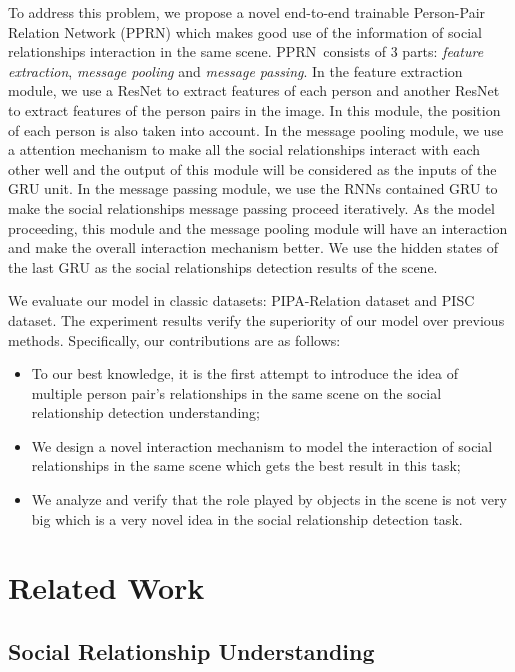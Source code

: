 \documentclass{article}
\newcommand{\PPRN}{{\sf PPRN}}
\begin{document}
To address this problem, we propose a novel end-to-end trainable Person-Pair Relation Network (\PPRN) which makes good use of the information of social relationships interaction in the same scene. \PPRN \ consists of 3 parts:  \emph{feature extraction}, \emph{message pooling} and \emph{message passing}. In the feature extraction module, we use a ResNet\cite{DBLP:conf/cvpr/HeZRS16} to extract features of each person and another ResNet to extract features of the person pairs in the image. In this module, the position of each person is also taken into account. In the message pooling module, we use a attention mechanism to make all the social relationships interact with each other well and the output of this module will be considered as the inputs of the GRU unit. In the message passing module,  we use the RNNs contained GRU to make the social relationships message passing proceed iteratively. As the model proceeding, this module and the message pooling module will have an interaction and make the overall interaction mechanism better. We use the hidden states of the last GRU as the social relationships detection results of the scene.

We evaluate our model in classic datasets: PIPA-Relation dataset and PISC dataset. The experiment results verify the superiority of our model over previous methods. Specifically, our contributions are as follows:
\begin{itemize}
	\item To our best knowledge, it is the first attempt to introduce the idea of multiple person pair's relationships in the same scene on the social relationship detection understanding;
	\item We design a novel interaction mechanism to model the interaction of social relationships in the same scene which gets the best result in this task;
	\item We analyze and verify that the role played by objects in the scene is not very big which is a very novel idea in the social relationship detection task.
\end{itemize}


\section{Related Work}

\subsection{Social Relationship Understanding}
\end{document}
